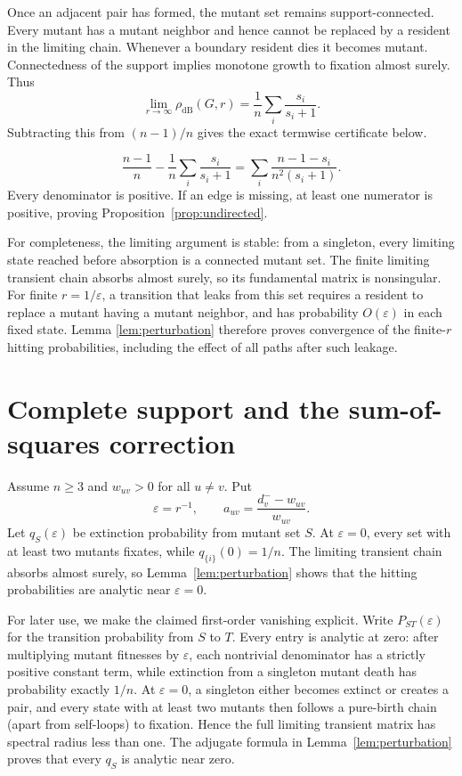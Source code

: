 \documentclass[11pt]{article}
\newcommand{\dB}{\mathrm{dB}}
\begin{document}
Once an adjacent pair has formed, the mutant set remains support-connected.
Every mutant has a mutant neighbor and hence cannot be replaced by a resident
in the limiting chain.  Whenever a boundary resident dies it becomes mutant.
Connectedness of the support implies monotone growth to fixation almost
surely.  Thus
\[
 \lim_{r\to\infty}\rho_{\dB}(G,r)
 =\frac1n\sum_i\frac{s_i}{s_i+1}.
\]
Subtracting this from $(n-1)/n$ gives the exact termwise certificate below.
\par\medskip
\begin{equation}\label{eq:support-gap}
 \frac{n-1}{n}-\frac1n\sum_i\frac{s_i}{s_i+1}
 =\sum_i\frac{n-1-s_i}{n^2(s_i+1)}.
\end{equation}
\smallskip
Every denominator is positive.  If an edge is missing, at least one numerator
is positive, proving Proposition~\ref{prop:undirected}.

For completeness, the limiting argument is stable: from a singleton, every
limiting state reached before absorption is a connected mutant set.  The
finite limiting transient chain absorbs almost surely, so its fundamental
matrix is nonsingular.  For finite $r=1/\varepsilon$, a transition that leaks
from this set requires a resident to replace a mutant having a mutant
neighbor, and has probability $O(\varepsilon)$ in each fixed state.  Lemma
\ref{lem:perturbation} therefore proves convergence of the finite-$r$ hitting
probabilities, including the effect of all paths after such leakage.

\section{Complete support and the sum-of-squares correction}

Assume $n\ge3$ and $w_{uv}>0$ for all $u\ne v$.  Put
\[
 \varepsilon=r^{-1},\qquad
 a_{uv}=\frac{d_v^- -w_{uv}}{w_{uv}}.
\]
Let $q_S(\varepsilon)$ be extinction probability from mutant set $S$.  At
$\varepsilon=0$, every set with at least two mutants fixates, while
$q_{\{i\}}(0)=1/n$.  The limiting transient chain absorbs almost surely, so
Lemma~\ref{lem:perturbation} shows that the hitting probabilities are analytic
near $\varepsilon=0$.

For later use, we make the claimed first-order vanishing explicit.  Write
$P_{ST}(\varepsilon)$ for the transition probability from $S$ to $T$.
Every entry is analytic at zero: after multiplying mutant fitnesses by
$\varepsilon$, each nontrivial denominator has a strictly positive constant
term, while extinction from a singleton mutant death has probability exactly
$1/n$.  At $\varepsilon=0$, a singleton either becomes extinct or creates a
pair, and every state with at least two mutants then follows a pure-birth
chain (apart from self-loops) to fixation.  Hence the full limiting transient
matrix has spectral radius less than one.  The adjugate formula in
Lemma~\ref{lem:perturbation} proves that every $q_S$ is analytic near zero.
\end{document}
